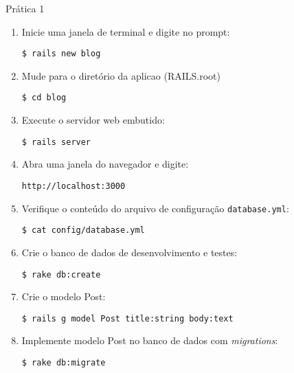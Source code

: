 \begin{frame}{Prática 1}
	\begin{enumerate}
		\item Inicie uma janela de terminal e digite no prompt:
			\begin{lstlisting}[style=BashInputBasicStyle]
			$ rails new blog
			\end{lstlisting}

		\item Mude para o diretório da aplicao (RAILS.root)
			\begin{lstlisting}[style=BashInputBasicStyle]
			$ cd blog
			\end{lstlisting}

		\item Execute o servidor web embutido:
		\begin{lstlisting}[style=BashInputBasicStyle]
			$ rails server
		\end{lstlisting}
		
		\item Abra uma janela do navegador e digite:
		\begin{lstlisting}[style=BashInputBasicStyle]
			http://localhost:3000
		\end{lstlisting}

		\item Verifique o conteúdo do arquivo de configuração \verb|database.yml|:
		\begin{lstlisting}[style=BashInputBasicStyle]
			$ cat config/database.yml
		\end{lstlisting}

		\item Crie o banco de dados de desenvolvimento e testes:
		\begin{lstlisting}[style=BashInputBasicStyle]
			$ rake db:create
		\end{lstlisting}

		\item Crie o modelo Post:
		\begin{lstlisting}[style=BashInputBasicStyle]
			$ rails g model Post title:string body:text
		\end{lstlisting}

		\item Implemente modelo Post no banco de dados com {\it migrations}:
		\begin{lstlisting}[style=BashInputBasicStyle]
			$ rake db:migrate
		\end{lstlisting}


\end{enumerate}
\end{frame}
